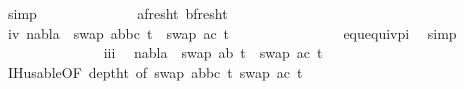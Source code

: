 \begin{isabellebody}
\ simp\isanewline
\ \ \ \ \ \ \ \ \ \ \ \ \isamarkupfalse%
\ a{\isacharunderscore}{\kern0pt}fresh{\isacharunderscore}{\kern0pt}t{}\ b{\isacharunderscore}{\kern0pt}fresh{\isacharunderscore}{\kern0pt}t{}\ \isanewline
\ \ \ \ \ \ \ \ \ \ \ \ \isamarkupfalse%
\ iv{\isacharcolon}{\kern0pt}\ {\isachardoublequoteopen}nabla\ {\isasymturnstile}\ swap\ {\isacharbrackleft}{\kern0pt}{\isacharparenleft}{\kern0pt}a{\isacharcomma}{\kern0pt}b{\isacharparenright}{\kern0pt}{\isacharcomma}{\kern0pt}{\isacharparenleft}{\kern0pt}b{\isacharcomma}{\kern0pt}c{\isacharparenright}{\kern0pt}{\isacharbrackright}{\kern0pt}\ t{}{\isacharprime}{\kern0pt}\ {\isasymapprox}\ swap\ {\isacharbrackleft}{\kern0pt}{\isacharparenleft}{\kern0pt}a{\isacharcomma}{\kern0pt}c{\isacharparenright}{\kern0pt}{\isacharbrackright}{\kern0pt}\ t{}{\isacharprime}{\kern0pt}{\isachardoublequoteclose}\isanewline
\ \ \ \ \ \ \ \ \ \ \ \ \ \ \isamarkupfalse%
\ equ{\isacharunderscore}{\kern0pt}equiv{\isacharunderscore}{\kern0pt}pi\ \isamarkupfalse%
\ simp\isanewline
\isanewline
\ \ \ \ \ \ \ \ \ \ \ \ \isamarkupfalse%
\ {}{\isacharparenleft}{\kern0pt}{}{\isacharparenright}{\kern0pt}\ iii\ \isamarkupfalse%
\ {\isachardoublequoteopen}nabla\ {\isasymturnstile}\ swap\ {\isacharbrackleft}{\kern0pt}{\isacharparenleft}{\kern0pt}a{\isacharcomma}{\kern0pt}b{\isacharparenright}{\kern0pt}{\isacharbrackright}{\kern0pt}\ t{}{\isacharprime}{\kern0pt}\ {\isasymapprox}\ swap\ {\isacharbrackleft}{\kern0pt}{\isacharparenleft}{\kern0pt}a{\isacharcomma}{\kern0pt}c{\isacharparenright}{\kern0pt}{\isacharbrackright}{\kern0pt}\ t{}{\isacharprime}{\kern0pt}{\isachardoublequoteclose}\isanewline
\ \ \ \ \ \ \ \ \ \ \ \ \ \ \isamarkupfalse%
\ IH{\isacharunderscore}{\kern0pt}usable{\isacharbrackleft}{\kern0pt}OF\ deptht{}{\isacharcomma}{\kern0pt}\ of\ {\isacartoucheopen}swap\ {\isacharparenleft}{\kern0pt}{\isacharbrackleft}{\kern0pt}{\isacharparenleft}{\kern0pt}a{\isacharcomma}{\kern0pt}b{\isacharparenright}{\kern0pt}{\isacharcomma}{\kern0pt}{\isacharparenleft}{\kern0pt}b{\isacharcomma}{\kern0pt}c{\isacharparenright}{\kern0pt}{\isacharbrackright}{\kern0pt}{\isacharparenright}{\kern0pt}\ t{}{\isacharprime}{\kern0pt}{\isacartoucheclose}\ {\isacartoucheopen}swap\ {\isacharbrackleft}{\kern0pt}{\isacharparenleft}{\kern0pt}a{\isacharcomma}{\kern0pt}c{\isacharparenright}{\kern0pt}{\isacharbrackright}{\kern0pt}\ t{}{\isacharprime}{\kern0pt}{\isacartoucheclose}{\isacharbrackright}{\kern0pt}\isanewline

\end{isabellebody}
